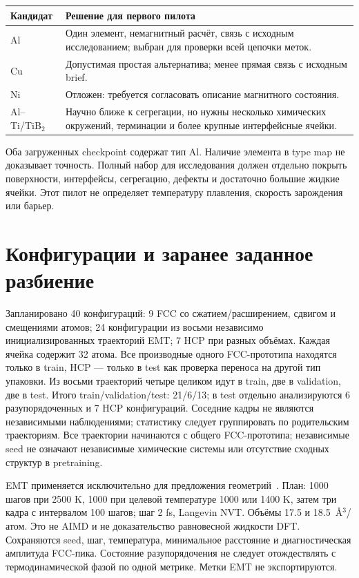 \documentclass[11pt,a4paper]{article}
\begin{document}
\begin{center}
\begin{tabular}{p{22mm}p{125mm}}
\toprule
Кандидат & Решение для первого пилота\\
\midrule
Al & Один элемент, немагнитный расчёт, связь с исходным исследованием;
выбран для проверки всей цепочки меток.\\
Cu & Допустимая простая альтернатива; менее прямая связь с исходным brief.\\
Ni & Отложен: требуется согласовать описание магнитного состояния.\\
Al--Ti/TiB$_2$ & Научно ближе к сегрегации, но нужны несколько химических
окружений, терминации и более крупные интерфейсные ячейки.\\
\bottomrule
\end{tabular}
\end{center}
Оба загруженных checkpoint содержат тип Al. Наличие элемента в type map
не доказывает точность. Полный набор для исследования должен отдельно покрыть
поверхности, интерфейсы, сегрегацию, дефекты и достаточно большие жидкие ячейки.
Этот пилот не определяет температуру плавления, скорость зарождения или барьер.

\section{Конфигурации и заранее заданное разбиение}
Запланировано 40 конфигураций: 9 FCC со сжатием/расширением, сдвигом и
смещениями атомов; 24 конфигурации из восьми независимо инициализированных
траекторий EMT; 7 HCP при разных объёмах. Каждая ячейка содержит 32 атома.
Все производные одного FCC-прототипа находятся только в train, HCP ---
только в test как проверка переноса на другой тип упаковки.
Из восьми траекторий четыре целиком идут в train, две в validation, две в test.
Итого train/validation/test: 21/6/13; в test отдельно анализируются 6
разупорядоченных и 7 HCP конфигураций. Соседние кадры не являются независимыми
наблюдениями; статистику следует группировать по родительским траекториям.
Все траектории начинаются с общего FCC-прототипа; независимые seed не означают
независимые химические системы или отсутствие сходных структур в pretraining.

EMT применяется исключительно для предложения геометрий~\cite{emt}.
План: 1000 шагов при 2500 K, 1000 при целевой температуре 1000 или 1400 K,
затем три кадра с интервалом 100 шагов; шаг 2 fs, Langevin NVT.
Объёмы 17.5 и 18.5~\AA$^3$/атом. Это не AIMD и не доказательство
равновесной жидкости DFT. Сохраняются seed, шаг, температура, минимальное
расстояние и диагностическая амплитуда FCC-пика. Состояние разупорядочения
не следует отождествлять с термодинамической фазой по одной метрике.
Метки EMT не экспортируются.
\end{document}
